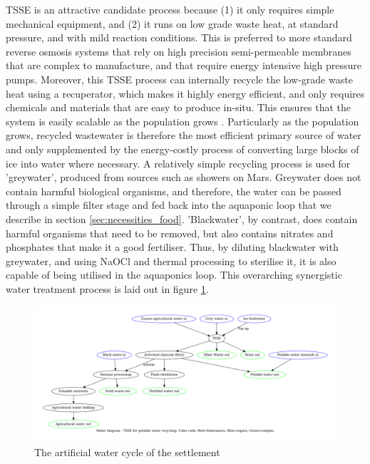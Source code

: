 \documentclass[fleqn,10pt]{Stylesheet} %
\begin{document}
TSSE is an attractive candidate process because (1) it only requires simple mechanical equipment, and (2) it runs on low grade waste heat, at standard pressure, and with mild reaction conditions. This is preferred to more standard reverse osmosis systems that rely on high precision semi-permeable membranes that are complex to manufacture, and that require energy intensive high pressure pumps. Moreover, this TSSE process can internally recycle the low-grade waste heat using a recuperator, which makes it highly energy efficient, and only requires chemicals and materials that are easy to produce in-situ. This ensures that the system is easily scalable as the population grows \cite{ChanheeBoo2019}. Particularly as the population grows, recycled wastewater is therefore the most efficient primary source of water and only supplemented by the energy-costly process of converting large blocks of ice into water where necessary. A relatively simple recycling process is used for 'greywater', produced from sources such as showers on Mars. Greywater does not contain harmful biological organisms, and therefore, the water can be passed through a simple filter stage and fed back into the aquaponic loop that we describe in section \ref{sec:necessities_food}. 'Blackwater', by contrast, does contain harmful organisms that need to be removed, but also contains nitrates and phosphates that make it a good fertiliser. Thus, by diluting blackwater with greywater, and using NaOCl and thermal processing to sterilise it, it is also capable of being utilised in the aquaponics loop. This overarching synergistic water treatment process is laid out in figure \ref{fig:water_diagram}.

\begin{figure}
    \centering
    \includegraphics[width=\linewidth]{figures/fig_water.pdf}
    \caption{The artificial water cycle of the settlement}
    \label{fig:water_diagram}
\end{figure}
\end{document}

